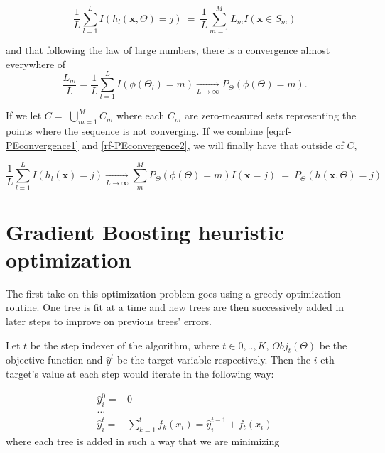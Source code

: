 \begin{appendices}
\begin{equation}
\frac{1}{L} \sum_{l=1}^L I(h_l(\textbf{x},\Theta) = j) \ = \ \frac{1}{L} \sum_{m=1}^M L_m I(\textbf{x} \in S_m)
\end{equation}\label{eq:rf-PEconvergence1}

and that following the law of large numbers, there is a convergence almost everywhere of
\begin{equation}\label{rf-PEconvergence2}
\frac{L_m}{L} = \frac{1}{L} \sum_{l=1}^L I(\phi(\Theta_l) = m) \xrightarrow[L \to \infty]{}  P_{\Theta}(\phi(\Theta)= m).
\end{equation}

If we let $C = $ $\bigcup\limits_{m=1}^{M} C_{m}$ where each $C_m$ are zero-measured sets representing the points where the sequence is not converging.
If we combine \cref{eq:rf-PEconvergence1} and \cref{rf-PEconvergence2}, we will finally have that outside of $C$,

\begin{equation}
\frac{1}{L} \sum_{l=1}^L I(h_l(\textbf{x}) = j) \xrightarrow[L \to \infty]{} \sum_m^M  P_{\Theta}(\phi(\Theta)= m) I(\textbf{x} =j ) \ = \ P_{\Theta}(h(\textbf{x}, \Theta) = j)
\end{equation}

\section{Gradient Boosting heuristic optimization}\label{appx:sec:boosting_optimization_heuristic}

The first take on this optimization problem goes using a greedy optimization routine.
One tree is fit at a time and new trees are then successively added in later steps to improve on previous trees' errors.

Let $t$ be the step indexer of the algorithm, where $t \in {0,..,K}$, $Obj_t(\Theta)$ be the objective function and $\hat{y}^t$ be the target variable respectively.
Then the $i$-eth target's value at each step would iterate in the following way:

\begin{equation}\label{eq:gb-targetSteps}
\begin{split}
\hat{y}_i^0 = & 0 \\
\ldots \\
\hat{y}_i^t = &\sum_{k=1}^{t} f_k(x_i) = \hat{y}^{t-1}_i + f_t(x_i)
\end{split}
\end{equation}
where each tree is added in such a way that we are minimizing


\end{appendices}
